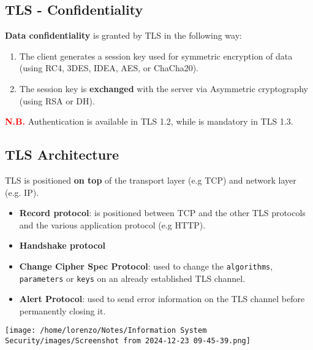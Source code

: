 \subsection{TLS - Confidentiality}
\textbf{Data confidentiality} is granted by TLS in the following way:
\begin{enumerate}
    \item The client generates a session key used for symmetric encryption of data (using RC4, 3DES, IDEA, AES, or ChaCha20). 
    \item The session key is \textbf{exchanged} with the server via Asymmetric cryptography (using RSA or DH).
\end{enumerate}
\textcolor{red}{\textbf{N.B.}} Authentication is available in TLS 1.2, while is mandatory in TLS 1.3. 

\subsection{TLS Architecture}
\begin{minipage}{0.6\textwidth}
    TLS is positioned \textbf{on top} of the transport layer (e.g TCP) and network layer (e.g. IP). 
    \begin{itemize}
        \item \textbf{Record protocol}: is positioned between TCP and the other TLS protocols and the various application protocol (e.g HTTP).
        \item \textbf{Handshake protocol}
        \item \textbf{Change Cipher Spec Protocol}: used to change the \texttt{algorithms}, \texttt{parameters} or \texttt{keys} on an already established TLS channel.
        \item \textbf{Alert Protocol}: used to send error information on the TLS channel before permanently closing it.
    \end{itemize} 
\end{minipage} 
\hspace{0.5cm}
\begin{minipage}{0.4\textwidth}
    \centering
    \texttt{[image: /home/lorenzo/Notes/Information System Security/images/Screenshot from 2024-12-23 09-45-39.png]}
\end{minipage}


